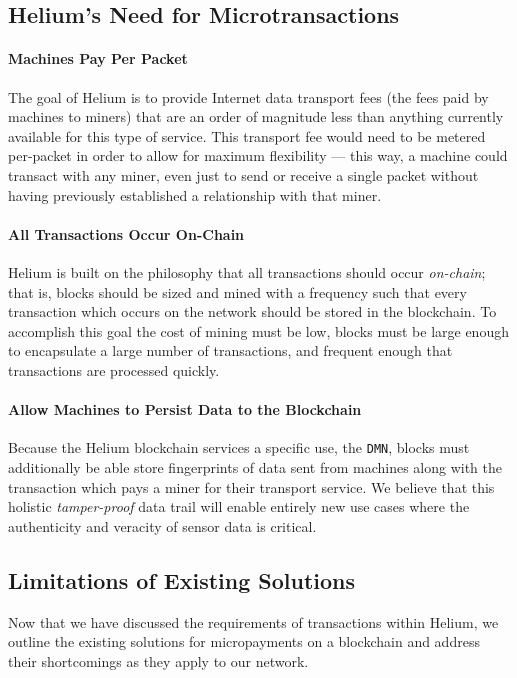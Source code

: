 \documentclass[10pt, nonatbib, nocopyrightspace, reprint]{sigplanconf}
\begin{document}
\subsection{Helium's Need for Microtransactions}

\paragraph{Machines Pay Per Packet}
The goal of Helium is to provide Internet data transport fees (the fees paid by machines to miners) that are an order of magnitude less than anything currently available for this type of service. This transport fee would need to be metered per-packet in order to allow for maximum flexibility --- this way, a machine could transact with any miner, even just to send or receive a single packet without having previously established a relationship with that miner.

\paragraph{All Transactions Occur On-Chain}
Helium is built on the philosophy that all transactions should occur \emph{on-chain}; that is, blocks should be sized and mined with a frequency such that every transaction which occurs on the network should be stored in the blockchain.  To accomplish this goal the cost of mining must be low, blocks must be large enough to encapsulate a large number of transactions, and frequent enough that transactions are processed quickly.

\paragraph{Allow Machines to Persist Data to the Blockchain}
Because the Helium blockchain services a specific use, the \verb|DMN|, blocks must additionally be able store fingerprints of data sent from machines along with the transaction which pays a miner for their transport service.  We believe that this holistic \emph{tamper-proof} data trail will enable entirely new use cases where the authenticity and veracity of sensor data is critical.

\subsection{Limitations of Existing Solutions}

Now that we have discussed the requirements of transactions within Helium, we outline the existing solutions for micropayments on a blockchain and address their shortcomings as they apply to our network.
\end{document}
